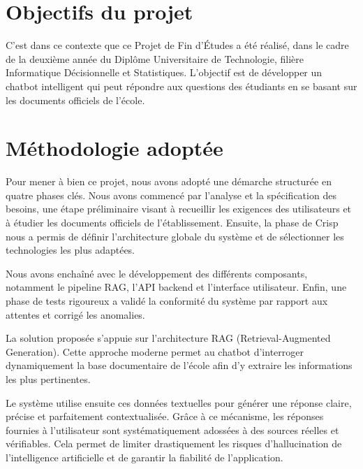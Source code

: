 \documentclass[12pt,a4paper]{report}
\begin{document}
\section{Objectifs du projet}
C'est dans ce contexte que ce Projet de Fin d'Études a été réalisé, dans le cadre de la deuxième année du Diplôme Universitaire de Technologie, filière \newline Informatique Décisionnelle et Statistiques. L'objectif est de développer un chatbot \newline intelligent qui peut répondre aux questions des étudiants en se basant sur les documents officiels de l'école.
\newpage

\section{Méthodologie adoptée}

Pour mener à bien ce projet, nous avons adopté une démarche structurée en quatre phases clés. Nous avons commencé par l'analyse et la spécification des besoins, une étape préliminaire visant à recueillir les exigences des utilisateurs et à étudier les documents officiels de l'établissement. Ensuite, la phase de Crisp nous a permis de définir \newline l'architecture globale du système et de sélectionner les technologies les plus adaptées.
\newline

Nous avons enchaîné avec le développement des différents composants, notamment le pipeline RAG, l'API backend et l'interface utilisateur. Enfin, une phase de tests rigoureux a validé la conformité du système par rapport aux attentes et corrigé les anomalies.
\newline

La solution proposée s'appuie sur l'architecture RAG (Retrieval-Augmented Generation). Cette approche moderne permet au chatbot d'interroger dynamiquement la base documentaire de l'école afin d'y extraire les informations les plus pertinentes.
\newline 

Le système utilise ensuite ces données textuelles pour générer une réponse claire, \newline précise et parfaitement contextualisée. Grâce à ce mécanisme, les réponses fournies à \newline l'utilisateur sont systématiquement adossées à des sources réelles et vérifiables. Cela \newline permet de  limiter drastiquement les risques d'hallucination de l'intelligence artificielle et de garantir la fiabilité de l'application.
\newline 
\end{document}
